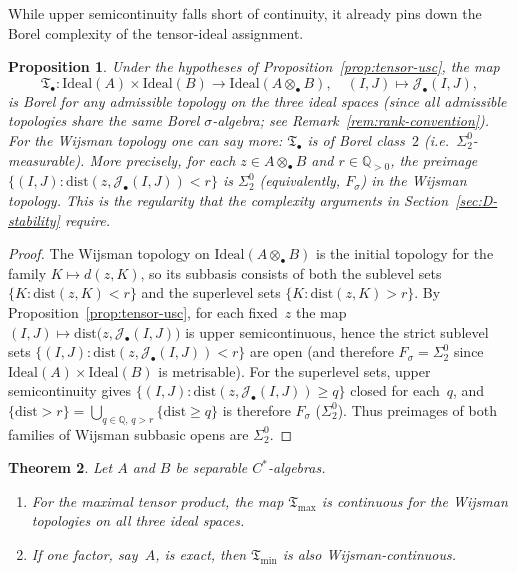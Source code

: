 \documentclass[12pt,fleqn,a4paper]{amsart}
\renewcommand{\ge}{\geqslant}
\numberwithin{equation}{section}
\newtheorem{theorem}{Theorem}[section]
\newtheorem{proposition}[theorem]{Proposition}
\theoremstyle{definition}
\newcommand{\Q}{\mathbb{Q}}
\newcommand{\Ideal}{\mathrm{Ideal}}
\newcommand{\dist}{\mathrm{dist}}
\begin{document}
While upper semicontinuity falls short of continuity, it already
pins down the Borel complexity of the tensor-ideal assignment.

\begin{proposition}
\label{prop:tensor-borel}
Under the hypotheses of Proposition~\ref{prop:tensor-usc}, the map
\[
\mathfrak T_\bullet:\Ideal(A)\times\Ideal(B)\to\Ideal(A\otimes_\bullet B),
\quad
(I,J)\mapsto\mathcal J_\bullet(I,J),
\]
is Borel for any admissible topology on the three ideal spaces
(since all admissible topologies share the same Borel $\sigma$-algebra;
see Remark~\ref{rem:rank-convention}).
For the \emph{Wijsman} topology one can say more: $\mathfrak T_\bullet$
is of Borel class~$2$ (\emph{i.e.}\ $\Sigma^0_2$-measurable).
More precisely, for each $z\in A\otimes_\bullet B$ and
$r\in\Q_{>0}$, the preimage
$\{(I,J):\dist(z,\mathcal J_\bullet(I,J))<r\}$
is $\Sigma^0_2$ (equivalently, $F_\sigma$) in the Wijsman topology.
This is the regularity that the complexity arguments in
Section~\ref{sec:D-stability} require.
\end{proposition}

\begin{proof}
The Wijsman topology on $\Ideal(A\otimes_\bullet B)$ is the initial topology
for the family $K\mapsto d(z,K)$, so its subbasis consists of both the sublevel sets
$\{K:\dist(z,K)<r\}$ and the superlevel sets $\{K:\dist(z,K)>r\}$.
By Proposition~\ref{prop:tensor-usc}, for each fixed~$z$ the map
$(I,J)\mapsto\dist\bigl(z,\mathcal J_\bullet(I,J)\bigr)$
is upper semicontinuous, hence the strict sublevel sets
$\{(I,J):\dist(z,\mathcal J_\bullet(I,J))<r\}$ are open (and therefore
$F_\sigma=\Sigma^0_2$ since $\Ideal(A)\times\Ideal(B)$ is metrisable).
For the superlevel sets, upper semicontinuity gives
$\{(I,J):\dist(z,\mathcal J_\bullet(I,J))\ge q\}$ closed for each~$q$, and
$\{\dist>r\}=\bigcup_{q\in\Q,\,q>r}\{\dist\ge q\}$
is therefore $F_\sigma$ ($\Sigma^0_2$).
Thus preimages of both families of Wijsman subbasic opens are $\Sigma^0_2$.
\end{proof}

\begin{theorem}
\label{thm:tensor-continuity}
Let $A$ and $B$ be separable $C^*$-algebras.
\begin{enumerate}
\item For the maximal tensor product, the map $\mathfrak T_{\max}$ is continuous
for the Wijsman topologies on all three ideal spaces.
\item If one factor, say~$A$, is exact, then $\mathfrak T_{\min}$ is also
Wijsman-continuous.
\end{enumerate}
\end{theorem}
\end{document}
